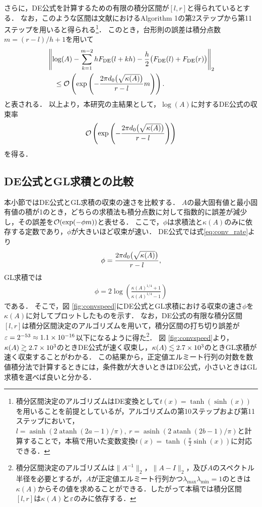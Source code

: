 \documentclass[12pt,a4paper,uplatex,dvipdfmx]{jsarticle}
\newcommand{\Fde}{F_{\mathrm{DE}}}
\newcommand{\lmdmax}{\lambda_{\mathrm{max}}}
\newcommand{\lmdmin}{\lambda_{\mathrm{min}}}
\DeclareMathOperator{\asinh}{asinh}
\DeclareMathOperator{\atanh}{atanh}
\begin{document}
  さらに，DE公式を計算するための有限の積分区間が$[l,r]$と得られているとする．
  なお，このような区間は文献\cite{tatsuoka_algorithms_2019}におけるAlgorithm 1の第2ステップから第11ステップを用いると得られる\footnote{%
    積分区間決定のアルゴリズム\cite[Alg.\ 1]{tatsuoka_algorithms_2019}はDE変換として$t(x)=\tanh(\sinh(x))$を用いることを前提としているが，アルゴリズムの第10ステップおよび第11ステップにおいて，$l = \asinh(2\atanh(2a-1)/\pi),\ r=\asinh(2\atanh(2b-1)/\pi)$と計算することで，本稿で用いた変数変換$t(x)=\tanh(\frac{\pi}{2}\sinh(x))$に対応できる．
  }．
  このとき，台形則の誤差は積分点数$m=(r-l)/h+1$を用いて
  \begin{align}\label{eq:rate_DE}
    &\norm{\log(A)-\sum_{k=1}^{m-2} h\Fde(l+kh) - \frac{h}{2}\bigl(\Fde(l)+\Fde(r)\bigr)}_2\\
    &\quad \le \calO\left(\exp\left(-\frac{2\pi d_0\bigl(\sqrt{\kpp(A)}\bigr)}{r-l}m\right)\right).
  \end{align}
  と表される．
  以上より，本研究の主結果として，$\log(A)$に対するDE公式の収束率
  \begin{align}\label{eq:conv_rate}
    \mathcal{O}\left(\exp\left(-\frac{2\pi d_0\bigl(\sqrt{\kappa(A)}\bigr)}{r-l}\right)\right)
  \end{align}
  を得る．

  \subsection{DE公式とGL求積との比較}
  本小節ではDE公式とGL求積の収束の速さを比較する．
  $A$の最大固有値と最小固有値の積が1のとき，どちらの求積法も積分点数に対して指数的に誤差が減少し，その誤差を$\mathcal{O}(\exp(-\phi m))$と表せる．
  ここで，$\phi$は求積法と$\kappa(A)$のみに依存する定数であり，$\phi$が大きいほど収束が速い．
  DE公式では式\eqref{eq:conv_rate}より
  \begin{align}
    \phi = \frac{2\pi d_0\bigl(\sqrt{\kappa(A)}\bigr)}{r-l},
  \end{align}
  GL求積では
  \begin{align}
    \phi = 2\log\left(\frac{\kappa(A)^{1/4}+1}{\kappa(A)^{1/4}-1}\right)
  \end{align}
  である\cite{fasi_computing_2018}．
  そこで，図 \ref{fig:convspeed}にDE公式とGL求積における収束の速さ$\phi$を$\kappa(A)$に対してプロットしたものを示す．
  なお，DE公式の有限な積分区間$[l,r]$は積分区間決定のアルゴリズム\cite[Alg.\ 1]{tatsuoka_algorithms_2019}を用いて，積分区間の打ち切り誤差が$\varepsilon=2^{-53}\approx 1.1\times 10^{-16}$以下になるように得た\footnote{%
    積分区間決定のアルゴリズム\cite[Alg.\ 1]{tatsuoka_algorithms_2019}は$\|A^{-1}\|_2$，$\|A-I\|_2$，及び$A$のスペクトル半径を必要とするが，$A$が正定値エルミート行列かつ$\lmdmax\lmdmin=1$のときは$\kappa(A)$からその値を求めることができる．したがって本稿では積分区間$[l,r]$は$\kappa(A)$と$\varepsilon$のみに依存する．
  }．
  図 \ref{fig:convspeed}より，$\kappa(A)\gtrsim 2.7 \times 10^3$のときDE公式が速く収束し，$\kappa(A)\lesssim 2.7 \times 10^3$のときGL求積が速く収束することがわかる．
  この結果から，正定値エルミート行列の対数を数値積分法で計算するときには，条件数が大きいときはDE公式，小さいときはGL求積を選べば良いと分かる．
\end{document}
